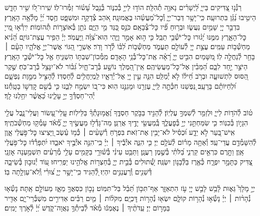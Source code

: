 \documentclass[twoside, openany, parskip=half, 11pt]{book}
\begin{document}
\begin{narrow}
רַנְּ֯נ֣וּ צַ֭דִּיקִים בַּייָ֑
לַ֝יְשָׁרִ֗ים נָאוָ֥ה תְ֯הִלָּֽה׃
הוֹד֣וּ לַייָ֣ בְּ֯כִנּ֑וֹר בְּ֯נֵ֥בֶל עָ֝שׂ֗וֹר זַמְּ֯רוּ־לֽוֹ׃
שִֽׁירוּ־ל֭וֹ שִׁ֣יר חָדָ֑שׁ הֵיטִ֥יבוּ נַ֝גֵּ֗ן בִּתְרוּעָֽה׃
כִּֽי־יָשָׁ֥ר דְּבַר־יְיָ֑ וְ֯כׇל־מַ֝עֲשֵׂ֗הוּ בֶּאֱמוּנָֽה׃
אֹ֭הֵב צְ֯דָקָ֣ה וּמִשְׁפָּ֑ט חֶ֥סֶד יְ֝יָ֗ מָלְ֯אָ֥ה הָאָֽרֶץ׃
בִּדְבַ֣ר יְיָ֭ שָׁמַ֣יִם נַעֲשׂ֑וּ וּבְר֥וּחַ פִּ֗֝יו כׇּל־צְ֯בָאָֽם׃
כֹּנֵ֣ס כַּ֭נֵּד מֵ֣י הַיָּ֑ם נֹתֵ֖ן בְּ֯אוֹצָר֣וֹת תְּ֯הוֹמֽוֹת׃
יִֽירְ֯א֣וּ מֵ֭ייָ כׇּל־הָאָ֑רֶץ מִמֶּ֥נּוּ יָ֝ג֗וּרוּ כׇּל־יֹשְׁ֯בֵ֥י תֵבֵֽל׃
כִּ֤י ה֣וּא אָמַ֣ר וַיֶּ֑הִי הֽוּא־צִ֝וָּ֗ה וַֽיַּעֲמֹֽד׃
יְיָ֗ הֵפִ֥יר עֲצַת־גּוֹיִ֑ם הֵ֝נִ֗יא מַחְשְׁ֯ב֥וֹת עַמִּֽים׃
עֲצַ֣ת יְיָ֭ לְ֯עוֹלָ֣ם תַּעֲמֹ֑ד מַחְשְׁ֯ב֥וֹת לִ֝בּ֗וֹ לְ֯דֹ֣ר וָדֹֽר׃
אַשְׁרֵ֣י הַ֭גּוֹי אֲשֶׁר־יְיָ֣ אֱלֹהָ֑יו הָעָ֓ם ׀ בָּחַ֖ר לְ֯נַחֲלָ֣ה לֽוֹ׃
מִ֭שָּׁמַיִם הִבִּ֣יט יְיָ֑ רָ֝אָ֗ה אֶֽת־כׇּל־בְּ֯נֵ֥י הָאָדָֽם׃
מִֽמְּ֯כוֹן־שִׁבְתּ֥וֹ הִשְׁגִּ֑יחַ אֶ֖ל כׇּל־יֹשְׁ֯בֵ֣י הָאָֽרֶץ׃
הַיֹּצֵ֣ר יַ֣חַד לִבָּ֑ם הַ֝מֵּבִ֗ין אֶל־כׇּל־מַעֲשֵׂיהֶֽם׃
אֵֽין־הַ֭מֶּלֶךְ נוֹשָׁ֣ע בְּ֯רׇב־חָ֑יִל גִּ֝בּ֗וֹר לֹא־יִנָּצֵ֥ל בְּ֯רׇב־כֹּֽחַ׃
שֶׁ֣קֶר הַ֭סּוּס לִתְשׁוּעָ֑ה וּבְרֹ֥ב חֵ֝יל֗וֹ לֹ֣א יְ֯מַלֵּֽט׃
הִנֵּ֤ה עֵ֣ין יְיָ֭ אֶל־יְ֯רֵאָ֑יו לַֽמְיַחֲלִ֥ים לְ֯חַסְדּֽוֹ׃
לְ֯הַצִּ֣יל מִמָּ֣וֶת נַפְשָׁ֑ם וּ֝לְחַיּוֹתָ֗ם בָּרָעָֽב׃
נַ֭פְשֵׁנוּ חִכְּ֯תָ֣ה לַֽייָ֑ עֶזְרֵ֖נוּ וּמָגִנֵּ֣נוּ הֽוּא׃
כִּי־ב֭וֹ יִשְׂמַ֣ח לִבֵּ֑נוּ כִּ֤י בְ֯שֵׁ֖ם קׇדְשׁ֣וֹ בָטָֽחְ֯נוּ׃
יְ֯הִי־חַסְדְּ֯ךָ֣ יְיָ֣ עָלֵ֑ינוּ כַּ֝אֲשֶׁ֗ר יִחַ֥לְנוּ לָֽךְ׃
\end{narrow}
\newcommand{\mizmorshabbat}{
\firstword{מִזְמ֥וֹר שִׁ֗יר לְ֯י֣וֹם הַשַּׁבָּֽת׃}\source{תהלים צב}
ט֗וֹב לְ֯הֹד֥וֹת לַייָ֑ וּלְזַמֵּ֖ר לְ֯שִׁמְךָ֣ עֶלְיֽוֹן׃
לְ֯הַגִּ֣יד בַּבֹּ֣קֶר חַסְדֶּ֑ךָ וֶ֝אֱמ֥וּנָתְ֯ךָ֗ בַּלֵּילֽוֹת׃
עֲֽלֵי־עָ֭שׂוֹר וַעֲלֵי־נָ֑בֶל עֲלֵ֖י הִגָּי֣וֹן בְּ֯כִנּֽוֹר׃
כִּ֤י שִׂמַּחְתַּ֣נִי יְיָ֣ בְּ֯פׇעֳלֶ֑ךָ בְּֽ֯מַעֲשֵׂ֖י יָדֶ֣יךָ אֲרַנֵּֽן׃
מַה־גָּדְ֯ל֣וּ מַעֲשֶׂ֣יךָ יְיָ֑ מְ֯֝אֹ֗ד עָמְ֯ק֥וּ מַחְשְׁ֯בֹתֶֽיךָ׃
אִֽישׁ־בַּ֭עַר לֹ֣א יֵדָ֑ע וּ֝כְסִ֗יל לֹא־יָבִ֥ין אֶת־זֹֽאת׃
בִּפְרֹ֤חַ רְ֯שָׁעִ֨ים ׀ כְּ֯מ֥וֹ עֵ֗שֶׂב וַ֭יָּצִיצוּ כׇּל־פֹּ֣עֲלֵי אָ֑וֶן לְ֯הִשָּׁמְ֯דָ֥ם עֲדֵי־עַֽד׃
וְ֯אַתָּ֥ה מָר֗וֹם לְ֯עֹלָ֥ם יְיָ׃
כִּ֤י הִנֵּ֪ה אֹיְ֯בֶ֡יךָ ׀ יְיָ֗ כִּֽי־הִנֵּ֣ה אֹיְ֯בֶ֣יךָ יֹאבֵ֑דוּ יִ֝תְפָּרְ֯ד֗וּ כׇּל־פֹּ֥עֲלֵי אָֽוֶן׃
וַתָּ֣רֶם כִּרְאֵ֣ים קַרְנִ֑י בַּ֝לֹּתִ֗י בְּ֯שֶׁ֣מֶן רַעֲנָֽן׃
וַתַּבֵּ֥ט עֵינִ֗י בְּ֯שׁ֫וּרָ֥י בַּקָּמִ֖ים עָלַ֥י מְ֯רֵעִ֗ים תִּשְׁמַ֥עְנָה אׇזְנָֽי׃
צַ֭דִּיק כַּתָּמָ֣ר יִפְרָ֑ח כְּ֯אֶ֖רֶז בַּלְּ֯בָנ֣וֹן יִשְׂגֶּֽה׃
שְׁ֭֯תוּלִים בְּ֯בֵ֣ית יְיָ֑ בְּ֯חַצְר֖וֹת אֱלֹהֵ֣ינוּ יַפְרִֽיחוּ׃
ע֭וֹד יְ֯נוּב֣וּן בְּ֯שֵׂיבָ֑ה דְּ֯שֵׁנִ֖ים וְֽ֯רַעֲנַנִּ֣ים יִהְיֽוּ׃
לְ֭֯הַגִּיד כִּֽי־יָשָׁ֣ר יְיָ֑ צ֝וּרִ֗י וְֽ֯לֹא־עַוְלָ֥תָה בּֽוֹ׃
}
\begin{narrow}
\mizmorshabbat

יְיָ֣ מָלָךְ֮ גֵּא֢וּת לָ֫בֵ֥שׁ
לָבֵ֣שׁ יְיָ֭ עֹ֣ז הִתְאַזָּ֑ר אַף־תִּכּ֥וֹן תֵּ֝בֵ֗ל בַּל־תִּמּֽוֹט׃
נָכ֣וֹן כִּסְאֲךָ֣ מֵאָ֑ז מֵעוֹלָ֣ם אָֽתָּה׃
נָשְׂ֯א֤וּ נְ֯הָר֨וֹת ׀ יְיָ֗ נָשְׂ֯א֣וּ נְ֯הָר֣וֹת קוֹלָ֑ם יִשְׂא֖וּ נְ֯הָר֣וֹת דׇּכְיָֽם׃
מִקֹּל֨וֹת ׀ מַ֤יִם רַבִּ֗ים אַדִּירִ֣ים מִשְׁבְּ֯רֵי־יָ֑ם אַדִּ֖יר בַּמָּר֣וֹם יְיָ׃
עֵֽדֹתֶ֨יךָ ׀ נֶאֶמְנ֬וּ מְ֯אֹ֗ד לְ֯בֵיתְ֯ךָ֥ נַאֲוָה־קֹ֑דֶשׁ יְ֝יָ֗ לְ֯אֹ֣רֶךְ יָמִֽים׃

\end{narrow}
\end{document}
